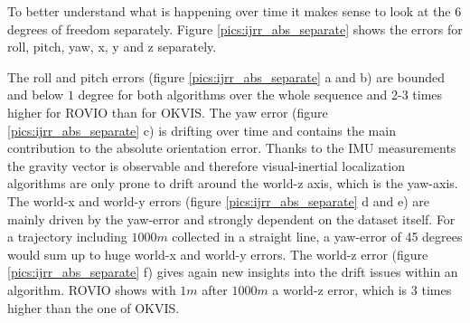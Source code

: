 To better understand what is happening over time it makes sense to look at the 6 degrees of freedom separately. Figure \ref{pics:ijrr_abs_separate} shows the errors for roll, pitch, yaw, x, y and z separately.


The roll and pitch errors (figure \ref{pics:ijrr_abs_separate} a and b) are bounded and below $1$ degree for both algorithms over the whole sequence and 2-3 times higher for ROVIO than for OKVIS. The yaw error (figure \ref{pics:ijrr_abs_separate} c) is drifting over time and contains the main contribution to the absolute orientation error. Thanks to the IMU measurements the gravity vector is observable and therefore visual-inertial localization algorithms are only prone to drift around the world-z axis, which is the yaw-axis. The world-x and world-y errors (figure \ref{pics:ijrr_abs_separate} d and e) are mainly driven by the yaw-error and strongly dependent on the dataset itself. For a trajectory including $1000 m$ collected in a straight line, a yaw-error of 45 degrees would sum up to huge world-x and world-y errors. The world-z error (figure \ref{pics:ijrr_abs_separate} f) gives again new insights into the drift issues within an algorithm. ROVIO shows with $1m$ after $1000m$ a world-z error, which is 3 times higher than the one of OKVIS. \\

